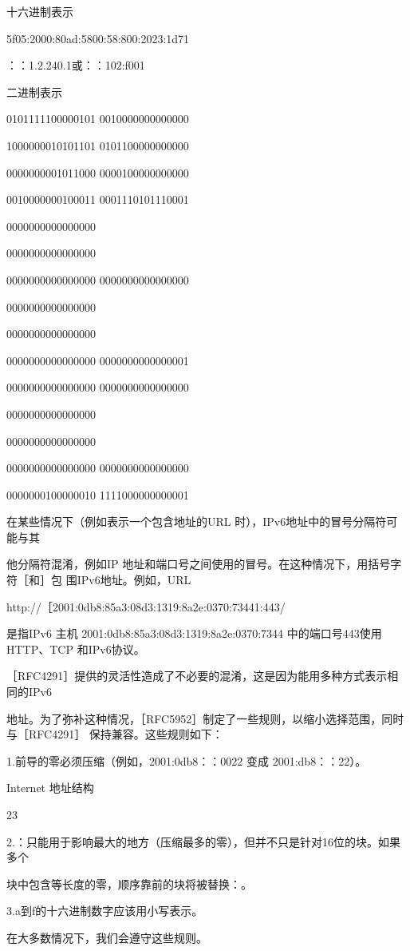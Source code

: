 十六进制表示

5f05:2000:80ad:5800:58:800:2023:1d71

：：1.2.240.1或：：102:f001

二进制表示

0101111100000101 0010000000000000

1000000010101101 0101100000000000

0000000001011000 0000100000000000

0010000000100011 0001110101110001

0000000000000000

0000000000000000

0000000000000000 0000000000000000

0000000000000000

0000000000000000

0000000000000000 0000000000000001

0000000000000000 0000000000000000

0000000000000000

0000000000000000

0000000000000000 0000000000000000

0000000100000010 1111000000000001

在某些情况下（例如表示一个包含地址的URL 时），IPv6地址中的冒号分隔符可能与其

他分隔符混淆，例如IP 地址和端口号之间使用的冒号。在这种情况下，用括号字符［和］包
围IPv6地址。例如，URL

http://［2001:0db8:85a3:08d3:1319:8a2e:0370:73441:443/

是指IPv6 主机 2001:0db8:85a3:08d3:1319:8a2e:0370:7344 中的端口号443使用HTTP、TCP
和IPv6协议。

［RFC4291］提供的灵活性造成了不必要的混淆，这是因为能用多种方式表示相同的IPv6

地址。为了弥补这种情况，［RFC5952］制定了一些规则，以缩小选择范围，同时与［RFC4291］
保持兼容。这些规则如下：

1.前导的零必须压缩（例如，2001:0db8：：0022 变成 2001:db8：：22）。

Internet 地址结构

23

2.：只能用于影响最大的地方（压缩最多的零），但并不只是针对16位的块。如果多个

块中包含等长度的零，顺序靠前的块将被替换：。

3.a到f的十六进制数字应该用小写表示。

在大多数情况下，我们会遵守这些规则。

